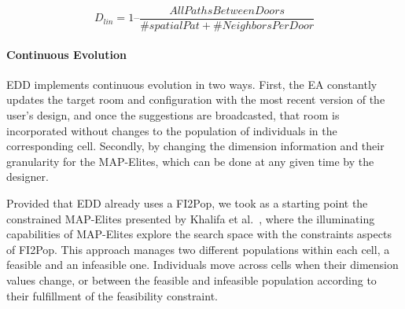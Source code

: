 \begin{equation} \label{eq:Linearity-eq}
D_{lin} = 1 \text{--} \frac{AllPathsBetweenDoors} {\#spatialPat + \#NeighborsPerDoor}
\end{equation}

\paragraph{Continuous Evolution}



EDD implements continuous evolution in two ways. First, the EA constantly updates the target room and configuration with the most recent version of the user’s design, and once the suggestions are broadcasted, that room is incorporated without changes to the population of individuals in the corresponding cell. Secondly, by changing the dimension information and their granularity for the MAP-Elites, which can be done at any given time by the designer. %

Provided that EDD already uses a FI2Pop, we took as a starting point the constrained MAP-Elites presented by Khalifa et al.~, where the illuminating capabilities of MAP-Elites explore the search space with the constraints aspects of FI2Pop. This approach manages two different populations within each cell, a feasible and an infeasible one. Individuals move across cells when their dimension values change, or between the feasible and infeasible population according to their fulfillment of the feasibility constraint.

